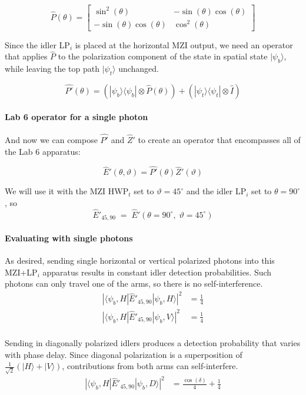 \documentclass{article}
\begin{document}
$$\hat{P}(\theta) = \left[\begin{matrix}\sin^{2}{\left(\theta \right)} & - \sin{\left(\theta \right)} \cos{\left(\theta \right)}\\- \sin{\left(\theta \right)} \cos{\left(\theta \right)} & \cos^{2}{\left(\theta \right)}\end{matrix}\right]$$


Since the idler LP$_i$ is placed at the horizontal MZI output, 
we need an operator that applies $\hat{P}$
to the polarization component of the state in spatial state $|\psi_b\rangle$,
while leaving the top path $|\psi_t\rangle$ unchanged.

$$  \hat{P'}(\theta) = (|\psi_b\rangle\langle\psi_b| \otimes \hat{P}(\theta)) + (|\psi_t\rangle\langle\psi_t| \otimes \hat{I}) $$

\paragraph{Lab 6 operator for a single photon}
And now we can compose $\hat{P'}$ and $\hat{Z}'$
to create an operator that encompasses all of the Lab 6 apparatus:

$$\hat{E}'(\theta,\vartheta) = \hat{P'}(\theta) \hat{Z}'(\vartheta)$$

We will use it with the MZI HWP$_t$ set to $\vartheta=45^\circ$ and 
the idler LP$_i$ set to $\theta=90^\circ$, so
$$
\hat{E}'_{45,90}\;=\;
\hat{E}'\!\left(\theta=90^\circ,\;\vartheta=45^\circ\right)
$$


\paragraph{Evaluating with single photons}

As desired, sending single horizontal or vertical polarized photons into
this MZI+LP$_i$ apparatus results in constant idler detection probabilities.
Such photons can only travel one of the arms, so there is no self-interference.
\begin{align*}
|\langle \psi_b,H |\hat{E}'_{45,90} |\psi_b, H\rangle|^2 &= \frac{1}{4} \\
|\langle \psi_b,H |\hat{E}'_{45,90} |\psi_b, V\rangle|^2 &= \frac{1}{4} \\
\end{align*}

Sending in diagonally polarized idlers produces a detection
probability that varies with phase delay.
Since diagonal polarization is a superposition of
$\frac{1}{\sqrt2}(|H\rangle+|V\rangle)$,
contributions from both arms can self-interfere.
\begin{align*}
|\langle \psi_b,H |\hat{E}'_{45,90} |\psi_b, D\rangle|^2 &= \frac{\cos{\left(\delta \right)}}{4} + \frac{1}{4}
\end{align*}
\end{document}
